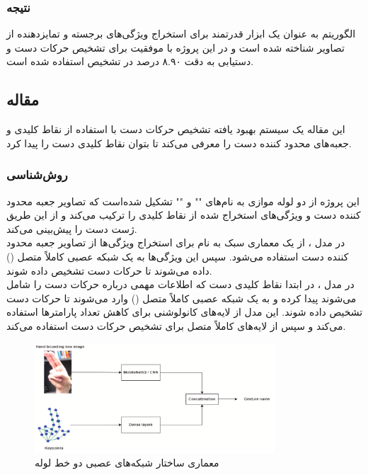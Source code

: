 \subsubsection{نتیجه}
الگوریتم  به عنوان یک ابزار قدرتمند برای استخراج ویژگی‌های برجسته و تمایزدهنده از تصاویر شناخته شده است و در این پروژه با موفقیت برای تشخیص حرکات دست و دستیابی به دقت ۸.۹۰ درصد در تشخیص استفاده شده است.

\cite{murugeswari2014hand}


\subsection{مقاله }
این مقاله یک سیستم بهبود یافته تشخیص حرکات دست با استفاده از نقاط کلیدی و جعبه‌های محدود کننده دست را معرفی می‌کند تا بتوان نقاط کلیدی دست را پیدا کرد.


\subsubsection{روش‌شناسی}
این پروژه از دو لوله موازی به نام‌های "" و "" تشکیل شده‌است که تصاویر جعبه 
محدود کننده دست و ویژگی‌های استخراج شده از نقاط کلیدی را ترکیب می‌کند و از این طریق ژست دست را پیش‌بینی می‌کند. 
\\
در مدل ، از یک معماری سبک به نام  برای استخراج ویژگی‌ها از تصاویر جعبه 
محدود کننده دست استفاده می‌شود. سپس این ویژگی‌ها به یک شبکه عصبی کاملاً متصل () داده می‌شوند تا حرکات دست تشخیص داده شوند.
\\
در مدل  ، در ابتدا نقاط کلیدی دست  که اطلاعات مهمی درباره حرکات دست را شامل می‌شوند پیدا کرده و به یک شبکه عصبی کاملاً متصل () وارد می‌شوند تا حرکات دست
تشخیص داده شوند. این مدل از لایه‌های کانولوشنی برای کاهش تعداد پارامترها استفاده می‌کند و سپس از لایه‌های کاملاً متصل برای تشخیص حرکات دست استفاده می‌کند.

\begin{figure}[h]
    \centering
    \includegraphics[width=0.8\textwidth]{keypoints_boundingBox.png}
    \caption{معماری ساختار شبکه‌های عصبی دو خط لوله}
\end{figure}


